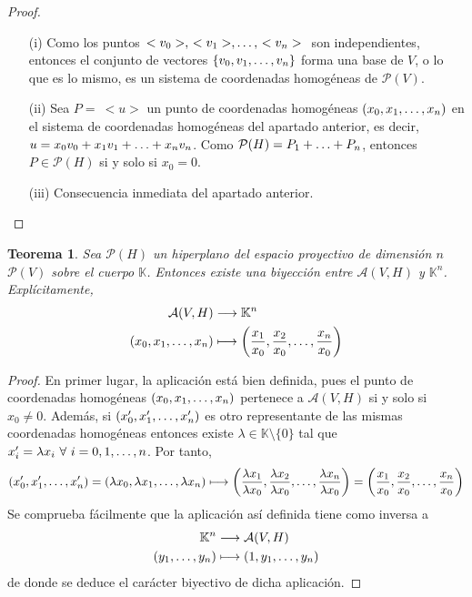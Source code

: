 \documentclass[12pt]{report}
\newtheorem{theorem}{Teorema}[chapter]
\theoremstyle{definition}
\theoremstyle{definition}
\theoremstyle{remark}
\begin{document}
\begin{proof}
\hfill
    \begin{itemize}
        \item[(i)] Como los puntos $\, <v_0>, \, <v_1>,\mathellipsis, \, <v_n> \ $ son independientes, entonces el conjunto de vectores $\{v_0,v_1,\mathellipsis,v_n\}$ forma una base de $V$, o lo que es lo mismo, es un sistema de coordenadas homogéneas de $\mathcal{P}(V)$.
        \item[(ii)] Sea $P = \ <u>$ un punto de coordenadas homogéneas $(x_0,x_1,\mathellipsis,x_n)$ en el sistema de coordenadas homogéneas del apartado anterior, es decir, $u = x_0v_0+x_1v_1+\mathellipsis+x_nv_n$. Como $\mathcal{P}(H) = P_1+\mathellipsis+P_n$, entonces $P \in \mathcal{P}(H)$ si y solo si $x_0 = 0$.
        \item[(iii)] Consecuencia inmediata del apartado anterior.
    \end{itemize}
\end{proof}

\begin{theorem}
\label{teo1.1.}
Sea $\mathcal{P}(H)$ un hiperplano del espacio proyectivo de dimensión $n$ $\mathcal{P}(V)$ sobre el cuerpo $\mathbb{K}$. Entonces existe una biyección entre $\mathcal{A}(V,H)$ y $\mathbb{K}^n$. Explícitamente,
\[
\begin{aligned}[t]
    \mathcal{A}(V,H) &\longrightarrow \mathbb{K}^n \\
    (x_0,x_1,\mathellipsis,x_n) &\longmapsto \biggl(\frac{x_1}{x_0},\frac{x_2}{x_0},\mathellipsis,\frac{x_n}{x_0}\biggr)
\end{aligned}
\]
\end{theorem}

\begin{proof}
En primer lugar, la aplicación está bien definida, pues el punto de coordenadas homogéneas $(x_0,x_1,\mathellipsis,x_n)$ pertenece a $\mathcal{A}(V,H)$ si y solo si $x_0 \neq 0$. Además, si $(x_0',x_1',\mathellipsis,x_n')$ es otro representante de las mismas coordenadas homogéneas entonces existe $\lambda \in \mathbb{K} \setminus \{0\}$ tal que $x_i' = \lambda x_i \ \forall \ i = 0,1,\mathellipsis,n$. Por tanto,
\[(x_0',x_1',\mathellipsis,x_n') = (\lambda x_0, \lambda x_1,\mathellipsis, \lambda x_n) \longmapsto \biggl(\frac{\lambda x_1}{\lambda x_0}, \frac{\lambda x_2}{\lambda x_0}, \mathellipsis, \frac{\lambda x_n}{\lambda x_0}\biggr) = \biggl(\frac{x_1}{x_0}, \frac{x_2}{x_0}, \mathellipsis, \frac{x_n}{x_0}\biggr)\]
Se comprueba fácilmente que la aplicación así definida tiene como inversa a
\[
\begin{aligned}[t]
    \mathbb{K}^n &\longrightarrow \mathcal{A}(V,H) \\
    (y_1,\mathellipsis,y_n) &\longmapsto (1,y_1,\mathellipsis,y_n)
\end{aligned}
\]
de donde se deduce el carácter biyectivo de dicha aplicación.
\end{proof}
\end{document}
